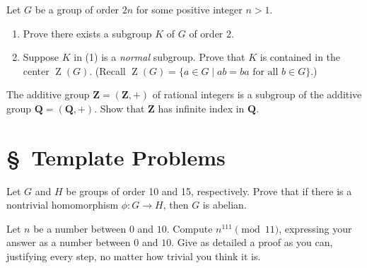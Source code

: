 \documentclass[11pt,twoside,openany]{memoir}
\begin{document}
        \begin{exercise}
        Let $G$ be a group of order $2n$ for some positive integer $n>1$.
        \begin{enumerate}[label = (\arabic*)]
            \item Prove there exists a subgroup $K$ of $G$ of order $2$.
            \item Suppose $K$ in (1) is a \textit{normal} subgroup. Prove that $K$ is contained in the center $\operatorname{Z}(G)$. (Recall $\operatorname{Z}(G)=\{a\in G\mid ab=ba\text{ for all }b\in G\}$.)
        \end{enumerate}
        \end{exercise}
        
        \begin{exercise}
        The additive group $\mathbf{Z}=(\mathbf{Z},+)$ of rational integers is a subgroup of the additive group $\mathbf{Q}=(\mathbf{Q},+)$. Show that $\mathbf{Z}$ has infinite index in $\mathbf{Q}$.
        \end{exercise}
\section*{\S\ Template Problems}


        \begin{exercise}
            Let $G$ and $H$ be groups of order 10 and 15, respectively. Prove that if there is a nontrivial homomorphism $\phi:G\to H$, then $G$ is abelian.
            \end{exercise}
            
            \begin{exercise}
            Let $n$ be a number between $0$ and $10$. Compute $n^{111}\pmod{11}$, expressing your answer as a number between $0$ and $10$. Give as detailed a proof as you can, justifying every step, no matter how trivial you think it is.
            \end{exercise}
            
\end{document}
